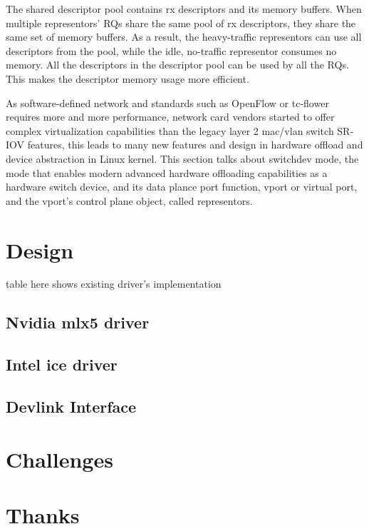 \documentclass[letterpaper]{article}
\begin{document}
The shared descriptor pool contains rx descriptors and its memory
buffers. When multiple representors' RQs share the same pool of rx
descriptors, they share the same set of memory buffers. As a result,
the heavy-traffic representors can use all descriptors from the pool,
while the idle, no-traffic representor consumes no memory. All the
descriptors in the descriptor pool can be used by all the RQs. This
makes the descriptor memory usage more efficient.


As software-defined network and standards such as OpenFlow or tc-flower
requires more and more performance, network card vendors started to offer
complex virtualization capabilities than the legacy layer 2 mac/vlan switch
SR-IOV features, this leads to many new features and design in hardware offload
and device abstraction in Linux kernel.
This section talks about switchdev mode, the mode that enables
modern advanced hardware offloading capabilities as a hardware switch device,
and its data plance port function, vport or virtual port, and the vport's
control plane object, called representors.

\section{Design}
table here shows existing driver's implementation

\subsection{Nvidia mlx5 driver}
\subsection{Intel ice driver}
\subsection{Devlink Interface}

\section{Challenges}
\section{Thanks}
\end{document}
